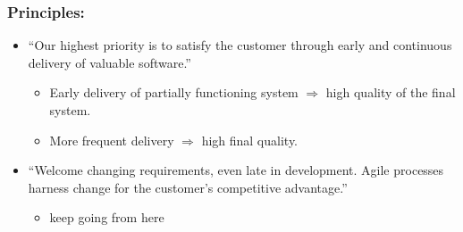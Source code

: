 \documentclass[11pt]{amsart}
\begin{document}
\subsubsection{Principles:}
\begin{itemize}
\item ``Our highest priority is to satisfy the customer through early and continuous delivery of valuable software.''
	\begin{itemize}
	\item  Early delivery of partially functioning system $\Rightarrow$ high quality of the final system.
	\item More frequent delivery $\Rightarrow$ high final quality.
	\end{itemize}

\item ``Welcome changing requirements, even late in development. Agile processes harness change for the customer's competitive advantage.''
	\begin{itemize}
	\item  keep going from here
	\end{itemize}
\end{itemize}
\end{document}
